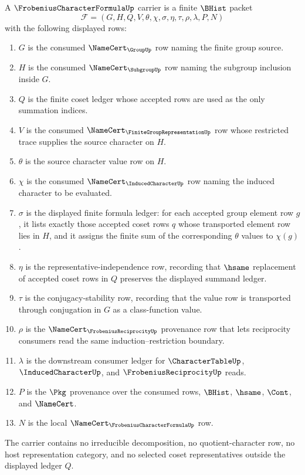 \begin{definition}
\label{def:frobenius-character-formula-carrier}
A $\FrobeniusCharacterFormulaUp$ carrier is a finite $\BHist$ packet
$$
\mathcal{F}=(G,H,Q,V,\theta,\chi,\sigma,\eta,\tau,\rho,\lambda,P,N)
$$
with the following displayed rows:
\begin{enumerate}
\item $G$ is the consumed $\NameCert_{\GroupUp}$ row naming the finite group source.
\item $H$ is the consumed $\NameCert_{\SubgroupUp}$ row naming the subgroup inclusion inside $G$.
\item $Q$ is the finite coset ledger whose accepted rows are used as the only summation indices.
\item $V$ is the consumed $\NameCert_{\FiniteGroupRepresentationUp}$ row whose restricted trace supplies the source character on $H$.
\item $\theta$ is the source character value row on $H$.
\item $\chi$ is the consumed $\NameCert_{\InducedCharacterUp}$ row naming the induced character to be evaluated.
\item $\sigma$ is the displayed finite formula ledger: for each accepted group element row $g$, it lists exactly those accepted coset rows $q$ whose transported element row lies in $H$, and it assigns the finite sum of the corresponding $\theta$ values to $\chi(g)$.
\item $\eta$ is the representative-independence row, recording that $\hsame$ replacement of accepted coset rows in $Q$ preserves the displayed summand ledger.
\item $\tau$ is the conjugacy-stability row, recording that the value row is transported through conjugation in $G$ as a class-function value.
\item $\rho$ is the $\NameCert_{\FrobeniusReciprocityUp}$ provenance row that lets reciprocity consumers read the same induction--restriction boundary.
\item $\lambda$ is the downstream consumer ledger for $\CharacterTableUp$, $\InducedCharacterUp$, and $\FrobeniusReciprocityUp$ reads.
\item $P$ is the $\Pkg$ provenance over the consumed rows, $\BHist$, $\hsame$, $\Cont$, and $\NameCert$.
\item $N$ is the local $\NameCert_{\FrobeniusCharacterFormulaUp}$ row.
\end{enumerate}
The carrier contains no irreducible decomposition, no quotient-character row, no host representation category, and no selected coset representatives outside the displayed ledger $Q$.
\end{definition}

